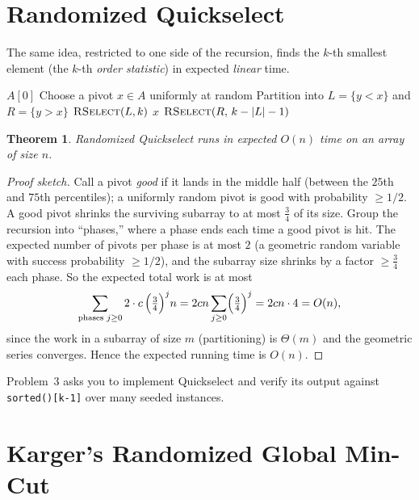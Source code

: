 \documentclass[11pt]{article}
\newtheorem{theorem}{Theorem}[section]
\begin{document}
\section{Randomized Quickselect}

The same idea, restricted to one side of the recursion, finds the $k$-th smallest
element (the $k$-th \emph{order statistic}) in expected \emph{linear} time.

\begin{algorithm}[h]
\caption{Randomized Quickselect (find the $k$-th smallest)}
\begin{algorithmic}[1]
     \Return $A[0]$ \EndIf
    \State Choose a pivot $x \in A$ uniformly at random
    \State Partition into $L = \{y < x\}$ and $R = \{y > x\}$
     \Return $\textsc{RSelect}(L, k)$
     \Return $x$
    \Else{} \Return $\textsc{RSelect}(R,\, k - |L| - 1)$
    \EndIf
\EndFunction
\end{algorithmic}
\end{algorithm}

\begin{theorem}
\label{thm:quickselect}
Randomized Quickselect runs in expected $O(n)$ time on an array of size $n$.
\end{theorem}

\begin{proof}[Proof sketch]
Call a pivot \emph{good} if it lands in the middle half (between the $25$th and
$75$th percentiles); a uniformly random pivot is good with probability $\ge 1/2$. A
good pivot shrinks the surviving subarray to at most $\tfrac34$ of its size.
Group the recursion into ``phases,'' where a phase ends each time a good pivot is
hit. The expected number of pivots per phase is at most $2$ (a geometric random
variable with success probability $\ge 1/2$), and the subarray size shrinks by a
factor $\ge \tfrac34$ each phase. So the expected total work is at most
\[
    \sum_{\text{phases } j \ge 0} 2 \cdot c\,\Bigl(\tfrac34\Bigr)^{j} n
    = 2cn \sum_{j \ge 0}\Bigl(\tfrac34\Bigr)^{j} = 2cn \cdot 4 = O(n),
\]
since the work in a subarray of size $m$ (partitioning) is $\Theta(m)$ and the
geometric series converges. Hence the expected running time is $O(n)$.
\end{proof}

Problem~3 asks you to implement Quickselect and verify its output against
\texttt{sorted()[k-1]} over many seeded instances.

\section{Karger's Randomized Global Min-Cut}
\end{document}
